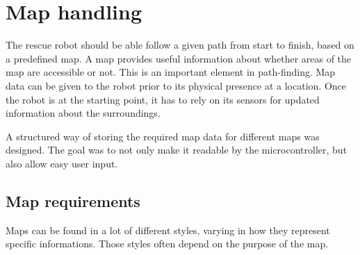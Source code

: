





\chapter{Map handling}
\label{ch:map} %
The rescue robot should be able follow a given path from start to finish, based on a predefined map.
A map provides useful information about whether areas of the map are accessible or not. This is an important element in path-finding.
Map data can be given to the robot prior to its physical presence at a location. Once the robot is at the starting point, it has to rely on its sensors for updated information about the surroundings.

A structured way of storing the required map data for different maps was designed. 
The goal was to not only make it readable by the microcontroller,
but also allow easy user input.


\newpage
\section{Map requirements}\label{ch:map_requirements}
Maps can be found in a lot of different styles,
varying in how they represent specific informations.
Those styles often depend on the purpose of the map.

